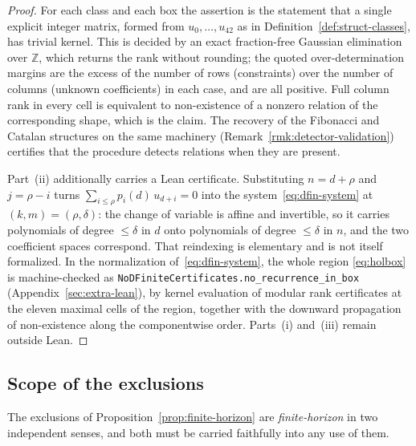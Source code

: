 \documentclass[11pt]{article}
\theoremstyle{plain}
\theoremstyle{definition}
\theoremstyle{remark}
\begin{document}
\begin{proof}
For each class and each box the assertion is the statement that a single
explicit integer matrix, formed from $u_0,\ldots,u_{42}$ as in
Definition~\ref{def:struct-classes}, has trivial kernel. This is decided by
an exact fraction-free Gaussian elimination over $\mathbb{Z}$, which returns
the rank without rounding; the quoted over-determination margins are the
excess of the number of rows (constraints) over the number of columns
(unknown coefficients) in each case, and are all positive. Full column rank
in every cell is equivalent to non-existence of a nonzero relation of the
corresponding shape, which is the claim. The recovery of the Fibonacci and
Catalan structures on the same machinery (Remark~\ref{rmk:detector-validation})
certifies that the procedure detects relations when they are present.

Part~(ii) additionally carries a Lean certificate. Substituting $n = d+\rho$
and $j = \rho-i$ turns $\sum_{i\le\rho} p_i(d)\,u_{d+i}=0$ into the
system~\eqref{eq:dfin-system} at $(k,m)=(\rho,\delta)$: the change of variable
is affine and invertible, so it carries polynomials of degree $\le \delta$ in
$d$ onto polynomials of degree $\le\delta$ in $n$, and the two coefficient
spaces correspond. That reindexing is elementary and is not itself formalized.
In the normalization of~\eqref{eq:dfin-system}, the whole region
\eqref{eq:holbox} is machine-checked as
\texttt{NoDFiniteCertificates.no\_recurrence\_in\_box}
(Appendix~\ref{sec:extra-lean}), by kernel evaluation of modular rank
certificates at the eleven maximal cells of the region, together with the
downward propagation of non-existence along the componentwise order. Parts~(i)
and~(iii) remain outside Lean.
\end{proof}

\subsection*{Scope of the exclusions}

The exclusions of Proposition~\ref{prop:finite-horizon} are
\emph{finite-horizon} in two independent senses, and both must be carried
faithfully into any use of them.
\end{document}
